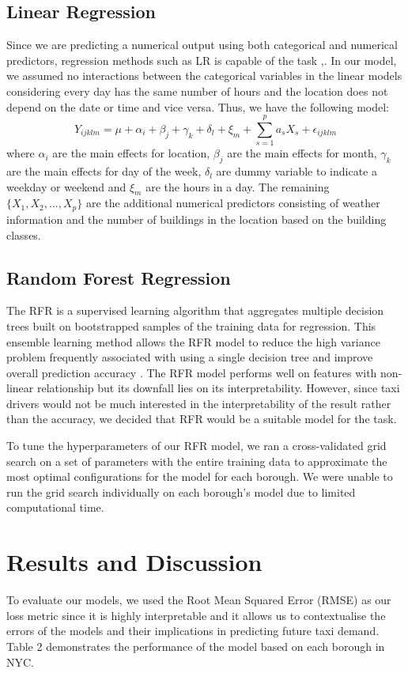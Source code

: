 \documentclass[11pt]{article}
\begin{document}
\subsection{Linear Regression}
Since we are predicting a numerical output using both categorical and numerical predictors, regression methods such as LR is capable of the task \cite{linearregression},\cite{linearstatsmodel}. In our model, we assumed no interactions between the categorical variables in the linear models considering every day has the same number of hours and the location does not depend on the date or time and vice versa. Thus, we have the following model:
$$Y_{ijklm}=\mu+\alpha_i+\beta_j+\gamma_k+\delta_l+\xi_m+\sum_{s=1}^{p}a_sX_s+\epsilon_{ijklm}$$
where $\alpha_i$ are the main effects for location, $\beta_j$ are the main effects for month, $\gamma_k$ are the main effects for day of the week, $\delta_l$ are dummy variable to indicate a weekday or weekend and $\xi_m$ are the hours in a day. The remaining $\{X_1,X_2,...,X_p\}$ are the additional numerical predictors consisting of weather information and the number of buildings in the location based on the building classes.

\subsection{Random Forest Regression}
The RFR is a supervised learning algorithm that aggregates multiple decision trees built on bootstrapped samples of the training data for regression. This ensemble learning method allows the RFR model to reduce the high variance problem frequently associated with using a single decision tree and improve overall prediction accuracy \cite{randomforest}. The RFR model performs well on features with non-linear relationship but its downfall lies on its interpretability. However, since taxi drivers would not be much interested in the interpretability of the result rather than the accuracy, we decided that RFR would be a suitable model for the task.

To tune the hyperparameters of our RFR model, we ran a cross-validated grid search on a set of parameters with the entire training data to approximate the most optimal configurations for the model for each borough. We were unable to run the grid search individually on each borough's model due to limited computational time.

\section{Results and Discussion}
To evaluate our models, we used the Root Mean Squared Error (RMSE) as our loss metric since it is highly interpretable and it allows us to contextualise the errors of the models and their implications in predicting future taxi demand. Table 2 demonstrates the performance of the model based on each borough in NYC.
\end{document}
